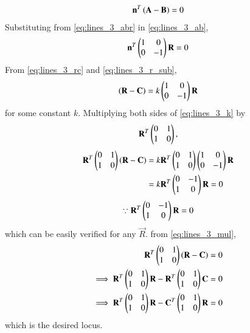 \documentclass[journal,12pt,twocolumn]{IEEEtran}
\begin{document}
\begin{enumerate}[label=\arabic*]
\begin{align}
\mathbf{n}^T\left(\mathbf{A} - \mathbf{B}\right) = 0
\label{eq:lines_3_ab}
\end{align}
%
Substituting from \eqref{eq:lines_3_abr} in \eqref{eq:lines_3_ab},
\begin{align}
\mathbf{n}^T\begin{pmatrix}1 & 0 \\ 0 & -1\end{pmatrix}\mathbf{R} = 0
\label{eq:lines_3_r_sub}
\end{align}
%
From \eqref{eq:lines_3_rc} and \eqref{eq:lines_3_r_sub},
\begin{align}
\left(\mathbf{R} - \mathbf{C}\right) = k\begin{pmatrix}1 & 0 \\ 0 & -1\end{pmatrix}\mathbf{R}
\label{eq:lines_3_k}
\end{align}
%
for some constant $k$.
Multiplying both sides of \eqref{eq:lines_3_k} by 
\begin{align}
\mathbf{R}^T\begin{pmatrix}0 & 1 \\ 1 & 0\end{pmatrix},
\end{align}
\begin{align}
\mathbf{R}^T\begin{pmatrix}0 & 1 \\ 1 & 0\end{pmatrix}\left(\mathbf{R} - \mathbf{C}\right) &= k\mathbf{R}^T\begin{pmatrix}0 & 1 \\ 1 & 0\end{pmatrix}\begin{pmatrix}1 & 0 \\ 0 & -1\end{pmatrix}\mathbf{R}
\nonumber \\
&= k\mathbf{R}^T\begin{pmatrix}0 & -1 \\ 1 & 0\end{pmatrix}\mathbf{R} = 0
\label{eq:lines_3_mul}
\end{align}
\begin{align}
\because \mathbf{R}^T\begin{pmatrix}0 & -1 \\ 1 & 0\end{pmatrix}\mathbf{R} = 0
\end{align}
which can be easily verified for any $\vec{R}$.
%
from \eqref{eq:lines_3_mul},
\begin{align}
\mathbf{R}^T\begin{pmatrix}0 & 1 \\ 1 & 0\end{pmatrix}\left(\mathbf{R} - \mathbf{C}\right) = 0
\nonumber \\
\implies \mathbf{R}^T\begin{pmatrix}0 & 1 \\ 1 & 0\end{pmatrix}\mathbf{R} - \mathbf{R}^T\begin{pmatrix}0 & 1 \\ 1 & 0\end{pmatrix}\mathbf{C} = 0
\nonumber \\
\implies \mathbf{R}^T\begin{pmatrix}0 & 1 \\ 1 & 0\end{pmatrix}\mathbf{R} - \mathbf{C}^T\begin{pmatrix}0 & 1 \\ 1 & 0\end{pmatrix}\mathbf{R} = 0
\end{align}
%
which is the desired locus.
\end{enumerate}
\end{document}
